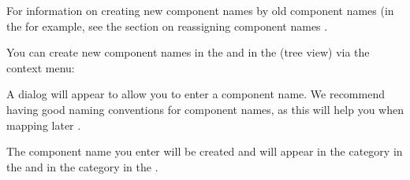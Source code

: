 
For information on creating new component names by  old component names (in the \gdcompnamesview{} for example, see the section on reassigning component names . 

You can create new component names in the \gdcompnamebrowser{}  and in the \gdomeditor{} (tree view) via the context menu:\\


A dialog will appear to allow you to enter a component name. We recommend having good naming conventions for component names, as this will help you when mapping later . 

The component name you enter will be created and will appear in the  category in the \gdomeditor{} and in the  category in the \gdcompnamebrowser{}. 

